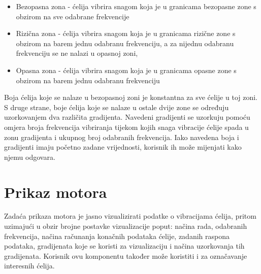 \documentclass[times, utf8, diplomski]{fer}
\begin{document}
\begin{itemize}
\item Bezopasna zona - ćelija vibrira snagom koja je u granicama bezopasne zone s obzirom na sve odabrane frekvencije
\item Rizična zona - ćelija vibrira snagom koja je u granicama rizične zone s obzirom na barem jednu odabranu frekvenciju, a za nijednu odabranu frekvenciju se ne nalazi u opasnoj zoni,
\item Opasna zona - ćelija vibrira snagom koja je u granicama opasne zone s obzirom na barem jednu odabranu frekvenciju\\
\end{itemize}

Boja ćelija koje se nalaze u bezopasnoj zoni je konstantna za sve ćelije u toj zoni. S druge strane, boje ćelija koje se nalaze u ostale dvije zone se određuju uzorkovanjem dva različita gradijenta. Navedeni gradijenti se uzorkuju pomoću omjera broja frekvencija vibriranja tijekom kojih snaga vibracije ćelije spada u zonu gradijenta i ukupnog broj odabranih frekvencija. Iako navedena boja i gradijenti imaju početno zadane vrijednosti, korisnik ih može mijenjati kako njemu odgovara.\\


\section{Prikaz motora} \label{engine-view-section}
Zadaća prikaza motora je jasno vizualizirati podatke o vibracijama ćelija, pritom uzimajući u obzir brojne postavke vizualizacije poput: načina rada, odabranih frekvencija, načina računanja konačnih podataka ćelije, zadanih raspona podataka, gradijenata koje se koristi za vizualizaciju i načina uzorkovanja tih gradijenata. Korisnik ovu komponentu također može koristiti i za označavanje interesnih ćelija.
\end{document}
